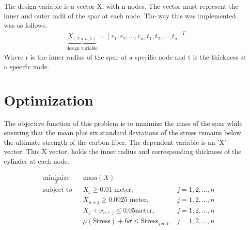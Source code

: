\documentclass[12pt]{article}
\begin{document}
	
	The design variable is a vector X, with n nodes. The vector must represent the inner and outer radii of the spar at each node. The way this was implemented was as follows: 
	\begin{align}
	\underbrace{X_{(2\times n,1)}}_\text{design variable}=[r_1,r_2,\dots,r_n,t_1,t_2,\dots,t_n]^T
	\end{align}
	Where r is the inner radius of the spar at a specific node and t is the thickness at a specific node. 
		

	
	\section{Optimization}
	The objective function of this problem is to minimize the mass of the spar while ensuring that the mean plus six standard deviations of the stress remains below the ultimate strength of the carbon fiber. The dependent variable is an 'X' vector. This X vector, holds the inner radius and corresponding thickness of the cylinder at each node. \par 
\begin{equation*}
\begin{aligned}
& \underset{X}{\text{minimize}}
& & \text{mass}(X) \\
& \text{subject to}
& & X_j \geq 0.01 \text{ meter},                    &j=1,2,\dots,n \\
&&& X_{n+j} \geq 0.0025 \text{ meter},            &j=1,2,\dots,n\\
&&& X_j + x_{n+j} \leq 0.05 \text {meter},       &j=1,2,\dots,n \\
&&& \mu(\text{Stress})+ 6 \sigma \leq \text{Stress}_\text{yeild}, 
&j=1,2,\dots,n
\end{aligned}
\label{eq:optim}
\end{equation*}


	
\end{document}
